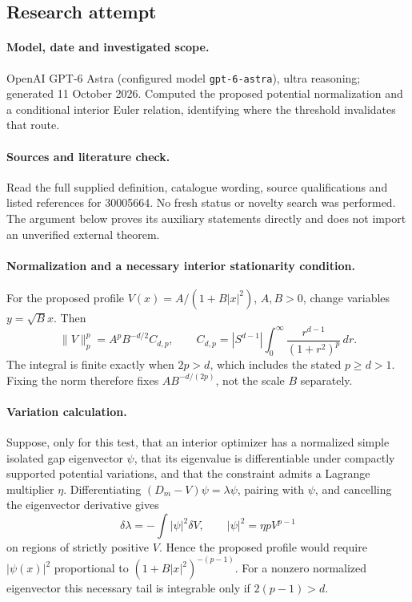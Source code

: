 \documentclass[11pt]{article}
\begin{document}
\subsection{Research attempt}
\paragraph{Model, date and investigated scope.}
OpenAI GPT-6 Astra (configured model \texttt{gpt-6-astra}), ultra reasoning; generated 11 October 2026. Computed the proposed potential normalization and a conditional interior Euler relation, identifying where the threshold invalidates that route.

\paragraph{Sources and literature check.}
Read the full supplied definition, catalogue wording, source qualifications and listed references for 30005664. No fresh status or novelty search was performed. The argument below proves its auxiliary statements directly and does not import an unverified external theorem.

\paragraph{Normalization and a necessary interior stationarity condition.} For the proposed profile \(V(x)=A/(1+B|x|^2)\), \(A,B>0\), change variables \(y=\sqrt Bx\). Then
\[
 \|V\|_p^p=A^p B^{-d/2}C_{d,p},\qquad
 C_{d,p}=|S^{d-1}|\int_0^\infty\frac{r^{d-1}}{(1+r^2)^p}\,dr.
\]
The integral is finite exactly when \(2p>d\), which includes the stated \(p\geq d>1\). Fixing the norm therefore fixes \(AB^{-d/(2p)}\), not the scale \(B\) separately.
\paragraph{Variation calculation.} Suppose, only for this test, that an interior optimizer has a normalized simple isolated gap eigenvector \(\psi\), that its eigenvalue is differentiable under compactly supported potential variations, and that the constraint admits a Lagrange multiplier \(\eta\). Differentiating \((D_m-V)\psi=\lambda\psi\), pairing with \(\psi\), and cancelling the eigenvector derivative gives
\[
 \delta\lambda=-\int|\psi|^2\delta V,
 \qquad |\psi|^2=\eta pV^{p-1}
\]
on regions of strictly positive \(V\). Hence the proposed profile would require \(|\psi(x)|^2\) proportional to \((1+B|x|^2)^{-(p-1)}\). For a nonzero normalized eigenvector this necessary tail is integrable only if \(2(p-1)>d\).
\end{document}
